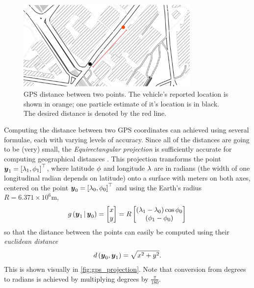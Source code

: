 \begin{knitrout}\small
{}\color{fgcolor}\begin{figure}

{\centering \includegraphics[width=0.8\textwidth]{figure/gps_dist-1} 

}

\caption[GPS distance between two points]{GPS distance between two points. The vehicle's reported location is shown in orange; one particle estimate of it's location is in black. The desired distance is denoted by the red line.}\label{fig:gps_dist}
\end{figure}


\end{knitrout}

Computing the distance between two GPS coordinates can achieved using several formulae, each with varying levels of accuracy. Since all of the distances are going to be (very) small, the \emph{Equirectangular projection} is sufficiently accurate for computing geographical distances \citep{Snyder_1998}. This projection transforms the point $\boldsymbol{y}_1 = \left[\lambda_1, \phi_1\right]^\top$, where latitude $\phi$ and longitude $\lambda$ are in radians (the width of one longitudinal radian depends on latitude) onto a surface with meters on both axes, centered on the point $\boldsymbol{y}_0 = \left[\lambda_0, \phi_0\right]^\top$ and using the Earth's radius $R = 6.371 \times 10^6$m,
\begin{equation}
\label{eq:equirectangular_projection}
g\left(\boldsymbol{y}_1\,|\,\boldsymbol{y}_0\right) =
\begin{bmatrix} x \\ y \end{bmatrix} =
R \begin{bmatrix}
(\lambda_1 - \lambda_0) \cos \phi_0 \\
(\phi_1 - \phi_0)
\end{bmatrix}
\end{equation}
so that the distance between the points can easily be computed
using their \emph{euclidean distance}
\begin{equation}
\label{eq:obs_dist}
d\left(\boldsymbol{y}_0, \boldsymbol{y}_1\right) = \sqrt{x^2 + y^2}.
\end{equation}
This is shown visually in \cref{fig:gps_projection}.
Note that conversion from degrees to radians is achieved by
multiplying degrees by $\frac{\pi}{180}$.

